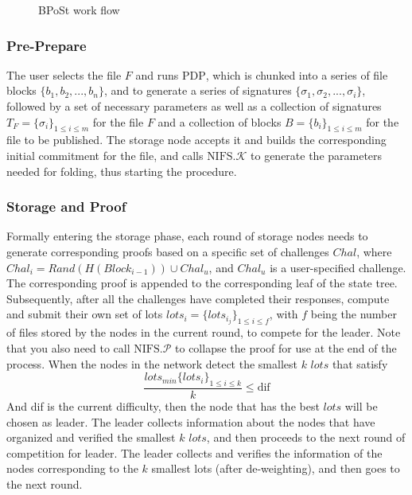 \documentclass[journal]{IEEEtran}
\begin{document}
\begin{figure}[htbp]
    \centering
    \caption{BPoSt work flow}
    \label{fig:BPoSt} 
\end{figure}


\subsubsection{Pre-Prepare}
The user selects the file $F$ and runs $\text{PDP}$, which is chunked into a series of file blocks $\{b_1, b_2, ... , b_n\}$, and to generate a series of signatures $\{\sigma_{1}, \sigma_{2}, ... , \sigma_{i}\}$, followed by a set of necessary parameters as well as a collection of signatures $T_{F}=\{\sigma_{i}\}_{1\le i\le m}$ for the file $F$ and a collection of blocks $B=\{b_{i}\}_{1\le i\le m}$ for the file to be published. The storage node accepts it and builds the corresponding initial commitment for the file, and calls $\text{NIFS.}\mathcal{K}$ to generate the parameters needed for folding, thus starting the procedure.


\subsubsection{Storage and Proof}
Formally entering the storage phase, each round of storage nodes needs to generate corresponding proofs based on a specific set of challenges $Chal$, where $Chal_i = Rand(H(Block_{i-1})) \cup Chal_{u}$, and $Chal_{u}$ is a user-specified challenge. The corresponding proof is appended to the corresponding leaf of the state tree. Subsequently, after all the challenges have completed their responses, compute and submit their own set of lots $lots_i = \{lots_{i_{j}}\}_{1\le i\le f}$, with $f$ being the number of files stored by the nodes in the current round, to compete for the leader. Note that you also need to call $\text{NIFS.}\mathcal{P}$ to collapse the proof for use at the end of the process. When the nodes in the network detect the smallest $k$ $lots$ that satisfy 
\[
\frac{lots_{min}\{lots_{i}\}_{1\le i\le k}}{k} \le \text{dif}
\] 
And dif is the current difficulty, then the node that has the best $lots$ will be chosen as leader. The leader collects information about the nodes that have organized and verified the smallest $k$ $lots$, and then proceeds to the next round of competition for leader. The leader collects and verifies the information of the nodes corresponding to the $k$ smallest lots (after de-weighting), and then goes to the next round.
\end{document}
